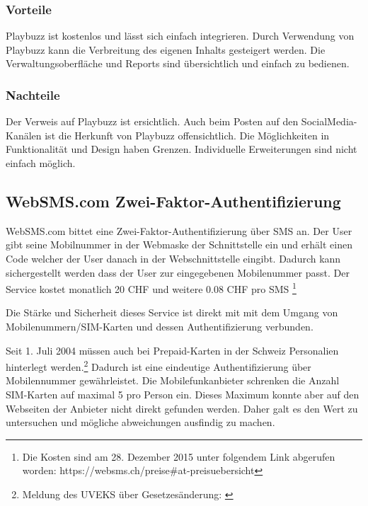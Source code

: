 \subsubsection{Vorteile}\label{vorteile-1}

Playbuzz ist kostenlos und lässt sich einfach integrieren. Durch
Verwendung von Playbuzz kann die Verbreitung des eigenen Inhalts
gesteigert werden. Die Verwaltungsoberfläche und Reports sind
übersichtlich und einfach zu bedienen.

\subsubsection{Nachteile}\label{nachteile-1}

Der Verweis auf Playbuzz ist ersichtlich. Auch beim Posten auf den
SocialMedia-Kanälen ist die Herkunft von Playbuzz offensichtlich. Die
Möglichkeiten in Funktionalität und Design haben Grenzen. Individuelle
Erweiterungen sind nicht einfach möglich.

\newpage

\subsection{WebSMS.com
Zwei-Faktor-Authentifizierung}\label{websms.com-zwei-faktor-authentifizierung}

WebSMS.com bittet eine Zwei-Faktor-Authentifizierung über SMS an. Der
User gibt seine Mobilnummer in der Webmaske der Schnittstelle ein und
erhält einen Code welcher der User danach in der Webschnittstelle
eingibt. Dadurch kann sichergestellt werden dass der User zur
eingegebenen Mobilenummer passt. Der Service kostet monatlich 20 CHF und
weitere 0.08 CHF pro SMS \footnote{Die Kosten sind am 28. Dezember 2015
  unter folgendem Link abgerufen worden:
  https://websms.ch/preise\#at-preisuebersicht}

Die Stärke und Sicherheit dieses Service ist direkt mit mit dem Umgang
von Mobilenummern/SIM-Karten und dessen Authentifizierung verbunden.

Seit 1. Juli 2004 müssen auch bei Prepaid-Karten in der Schweiz
Personalien hinterlegt werden.\footnote{Meldung des UVEKS über
  Gesetzesänderung: \autocite{uvek}} Dadurch ist eine eindeutige
Authentifizierung über Mobilennummer gewährleistet. Die
Mobilefunkanbieter schrenken die Anzahl SIM-Karten auf maximal 5 pro
Person ein. Dieses Maximum konnte aber auf den Webseiten der Anbieter
nicht direkt gefunden werden. Daher galt es den Wert zu untersuchen und
mögliche abweichungen ausfindig zu machen.


